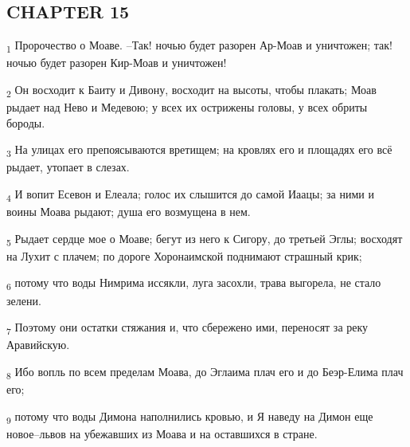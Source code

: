 \subsection{CHAPTER 15}
\begin{tcolorbox}
\textsubscript{1} Пророчество о Моаве. --Так! ночью будет разорен Ар-Моав и уничтожен; так! ночью будет разорен Кир-Моав и уничтожен!
\end{tcolorbox}
\begin{tcolorbox}
\textsubscript{2} Он восходит к Баиту и Дивону, восходит на высоты, чтобы плакать; Моав рыдает над Нево и Медевою; у всех их острижены головы, у всех обриты бороды.
\end{tcolorbox}
\begin{tcolorbox}
\textsubscript{3} На улицах его препоясываются вретищем; на кровлях его и площадях его всё рыдает, утопает в слезах.
\end{tcolorbox}
\begin{tcolorbox}
\textsubscript{4} И вопит Есевон и Елеала; голос их слышится до самой Иаацы; за ними и воины Моава рыдают; душа его возмущена в нем.
\end{tcolorbox}
\begin{tcolorbox}
\textsubscript{5} Рыдает сердце мое о Моаве; бегут из него к Сигору, до третьей Эглы; восходят на Лухит с плачем; по дороге Хоронаимской поднимают страшный крик;
\end{tcolorbox}
\begin{tcolorbox}
\textsubscript{6} потому что воды Нимрима иссякли, луга засохли, трава выгорела, не стало зелени.
\end{tcolorbox}
\begin{tcolorbox}
\textsubscript{7} Поэтому они остатки стяжания и, что сбережено ими, переносят за реку Аравийскую.
\end{tcolorbox}
\begin{tcolorbox}
\textsubscript{8} Ибо вопль по всем пределам Моава, до Эглаима плач его и до Беэр-Елима плач его;
\end{tcolorbox}
\begin{tcolorbox}
\textsubscript{9} потому что воды Димона наполнились кровью, и Я наведу на Димон еще новое--львов на убежавших из Моава и на оставшихся в стране.
\end{tcolorbox}
